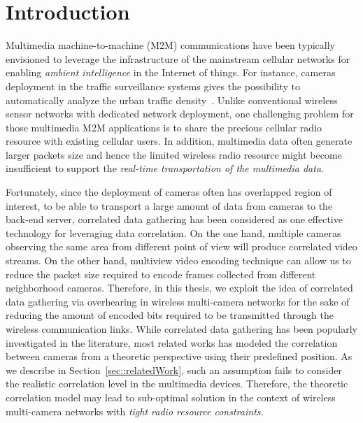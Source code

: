 \section{Introduction}
\label{sec::introduction}
Multimedia machine-to-machine (M2M) communications have been typically envisioned to leverage the infrastructure of the mainstream cellular networks for enabling {\em ambient intelligence} in the Internet of things.
For instance, cameras deployment in the traffic surveillance systems gives the possibility to automatically analyze the urban traffic density~\cite{Kapsch,Traficon,Citilog}.
%
Unlike conventional wireless sensor networks with dedicated network deployment, one challenging problem for those multimedia M2M applications is to share the precious cellular radio resource with existing cellular users.
%
In addition, multimedia data often generate larger packets size and hence the limited wireless radio resource might become insufficient to support the {\em real-time transportation of the multimedia data}.

Fortunately, since the deployment of cameras often has overlapped region of interest, to be able to transport a large amount of data from cameras to the back-end server, correlated data gathering has been considered as one effective technology for leveraging data correlation.
On the one hand, multiple cameras observing the same area from different point of view will produce correlated video streams. 
On the other hand, multiview video encoding technique can allow us to reduce the packet size required to encode frames collected from different neighborhood cameras.
Therefore, in this thesis, we exploit the idea of correlated data gathering via overhearing in wireless multi-camera networks for the sake of reducing the amount of encoded bits required to be transmitted through the wireless communication links.
%
While correlated data gathering has been popularly investigated in the literature, most related works has modeled the correlation between cameras from a theoretic perspective using their predefined position.
As we describe in Section~\ref{sec::relatedWork}, such an assumption fails to consider the realistic correlation level in the multimedia devices.
Therefore, the theoretic correlation model may lead to sub-optimal solution in the context of wireless multi-camera networks with {\em tight radio resource constraints.}

